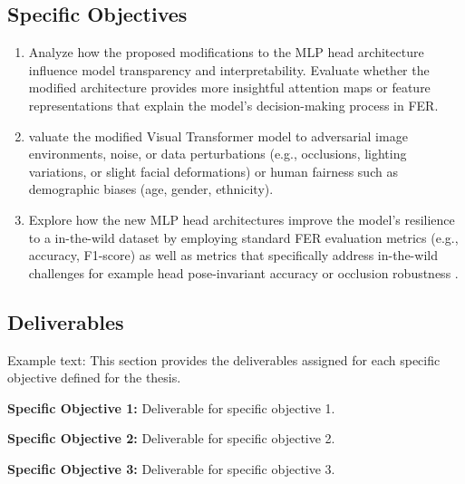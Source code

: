 \subsection{Specific Objectives}
\label{section:specific-objectives}

\begin{enumerate}
	\item Analyze how the proposed modifications to the MLP head architecture influence model transparency and interpretability. Evaluate whether the modified architecture provides more insightful attention maps or feature representations that explain the model's decision-making process in FER. 
	
\item valuate the modified Visual Transformer model to adversarial image environments, noise, or data perturbations (e.g., occlusions, lighting variations, or slight facial deformations) or human fairness such as demographic biases (age, gender, ethnicity). 
	
\item Explore how the new MLP head architectures improve the model’s resilience to a in-the-wild dataset by employing standard FER evaluation metrics (e.g., accuracy, F1-score) as well as metrics that specifically address in-the-wild challenges for example head pose-invariant accuracy or occlusion robustness .
	
\end{enumerate}

\subsection{Deliverables}
Example text:
This section provides the deliverables assigned for each specific objective defined for the thesis.

\textbf{Specific Objective 1:}
Deliverable for specific objective 1. 

\textbf{Specific Objective 2:}
Deliverable for specific objective 2.

\textbf{Specific Objective 3:}
Deliverable for specific objective 3.



